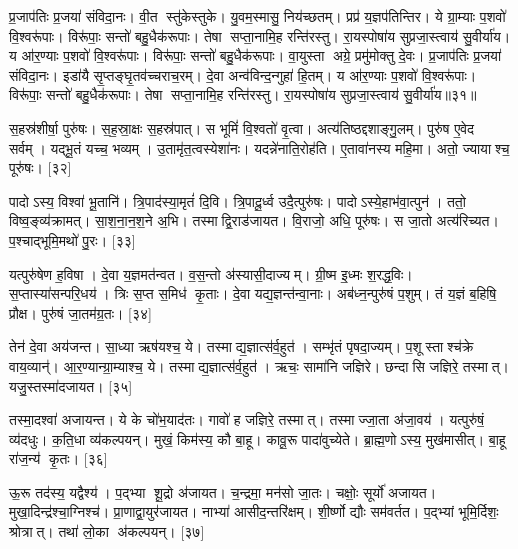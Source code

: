 प्र॒जाप॑तिः प्र॒जया॑ संविदा॒नः। वी॒त स्तु॑केस्तुके। यु॒वम॒स्मासु॒ निय॑च्छतम्। प्रप्र॑ य॒ज्ञप॑तिन्तिर। ये ग्रा॒म्याः प॒शवो॑ वि॒श्वरू॑पाः। विरू॑पाः॒ सन्तो॑ बहु॒धैक॑रूपाः। तेषा सप्ता॒नामि॒ह रन्ति॑रस्तु। रा॒यस्पोषा॑य सुप्रजा॒स्त्वाय॑ सु॒वीर्या॑य। य आ॑र॒ण्याः प॒शवो॑ वि॒श्वरू॑पाः। विरू॑पाः॒ सन्तो॑ बहु॒धैक॑रूपाः। वा॒युस्ता अग्रे॒ प्रमु॑मोक्तु दे॒वः। प्र॒जाप॑तिः प्र॒जया॑ संविदा॒नः। इडा॑यै सृ॒प्तङ्घृ॒तव॑च्चराच॒रम्। दे॒वा अन्व॑विन्द॒न्गुहा॑ हि॒तम्। य आ॑र॒ण्याः प॒शवो॑ वि॒श्वरू॑पाः। विरू॑पाः॒ सन्तो॑ बहु॒धैक॑रूपाः। तेषा सप्ता॒नामि॒ह रन्ति॑रस्तु। रा॒यस्पोषा॑य सुप्रजा॒स्त्वाय॑ सु॒वीर्या॑य॥३१॥
\anuvakamend[आ॒त्मा जना॑नां  विकु॒र्वन्तं॑  विप॒श्चिं प्र॒जानां वसु॒धानीं  वि॒राजं॒ चर॑न्तं॒  गोम॑तीं मे॒ निय॑च्छ॒त्वेक॑चक्र॒व्व्योँ॑मन्मा॒यया॑ दे॒व एक॑रूपा अ॒ष्टौ च॑]

स॒हस्र॑शीर्\mbox{}षा॒ पुरु॑षः। स॒ह॒स्रा॒क्षः स॒हस्र॑पात्। स भूमिं॑ वि॒श्वतो॑ वृ॒त्वा। अत्य॑तिष्ठद्दशाङ्गु॒लम्। पुरु॑ष ए॒वेद सर्वम्। यद्भू॒तं यच्च॒ भव्यम्। उ॒तामृ॑त॒त्वस्येशा॑नः। यदन्ने॑नाति॒रोह॑ति। ए॒तावा॑नस्य महि॒मा। अतो॒ ज्यायाश्च॒ पूरु॑षः। [३२]

पादोऽस्य॒ विश्वा॑ भू॒तानि॑। त्रि॒पाद॑स्या॒मृतं॑ दि॒वि। त्रि॒पादू॒र्ध्व उदै॒त्पुरु॑षः। पादोऽस्ये॒हाभ॑वा॒त्पुन॑। ततो॒ विष्व॒ङ्व्य॑क्रामत्। सा॒श॒ना॒न॒श॒ने अ॒भि। तस्माद्वि॒राड॑जायत। वि॒राजो॒ अधि॒ पूरु॑षः। स जा॒तो अत्य॑रिच्यत। प॒श्चाद्भूमि॒मथो॑ पु॒रः। [३३]

यत्पुरु॑षेण ह॒विषा। दे॒वा य॒ज्ञमत॑न्वत। व॒स॒न्तो अ॑स्यासी॒दाज्यम्। ग्री॒ष्म इ॒ध्मः  श॒रद्ध॒विः। स॒प्तास्या॑सन्परि॒धय॑। त्रिः स॒प्त स॒मिध॑ कृ॒ताः। दे॒वा यद्य॒ज्ञन्त॑न्वा॒नाः। अब॑ध्न॒न्पुरु॑षं प॒शुम्। तं य॒ज्ञं ब॒\ar{}हिषि॒ प्रौक्ष\sn{}। पुरु॑षं जा॒तम॑ग्र॒तः। [३४]

तेन॑ दे॒वा अय॑जन्त। सा॒ध्या ऋष॑यश्च॒ ये। तस्माद्य॒ज्ञात्स॑र्व॒हुत॑। सम्भृ॑तं पृषदा॒ज्यम्। प॒शूस्ताश्च॑क्रे वाय॒व्यान्॑। आ॒र॒ण्यान्ग्रा॒म्याश्च॒ ये। तस्माद्य॒ज्ञात्स॑र्व॒हुत॑। ऋचः॒ सामा॑नि जज्ञिरे। छन्दासि जज्ञिरे॒ तस्मात्। यजु॒स्तस्मा॑दजायत। [३५]

तस्मा॒दश्वा॑ अजायन्त। ये के चो॑भ॒याद॑तः। गावो॑ ह जज्ञिरे॒ तस्मात्। तस्माज्जा॒ता अ॑जा॒वय॑। यत्पुरु॑षं॒ व्य॑दधुः। क॒ति॒धा व्य॑कल्पयन्। मुखं॒ किम॑स्य॒ कौ बा॒हू। कावू॒रू पादा॑वुच्येते। ब्रा॒ह्म॒णोऽस्य॒ मुख॑मासीत्। बा॒हू रा॑ज॒न्य॑ कृ॒तः। [३६]

ऊ॒रू तद॑स्य॒ यद्वैश्य॑। प॒द्भ्या शू॒द्रो अ॑जायत। च॒न्द्रमा॒ मन॑सो जा॒तः। चक्षोः॒ सूर्यो॑ अजायत। मुखा॒दिन्द्र॑श्चा॒ग्निश्च॑। प्रा॒णाद्वा॒युर॑जायत। नाभ्या॑ आसीद॒न्तरि॑क्षम्। शी॒र्ष्णो द्यौः सम॑वर्तत। प॒द्भ्यां भूमि॒र्दिशः॒ श्रोत्रात्। तथा॑ लो॒का अ॑कल्पयन्। [३७]

